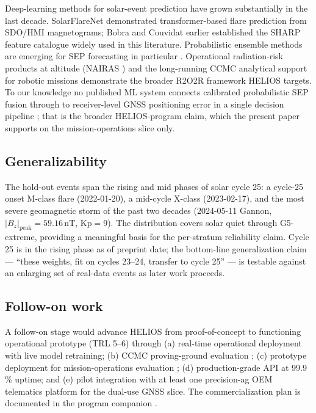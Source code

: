 \documentclass[11pt,letterpaper]{article}
\begin{document}
Deep-learning methods for solar-event prediction have grown substantially in
the last decade.  SolarFlareNet \cite{sun2023} demonstrated transformer-based
flare prediction from SDO/HMI magnetograms; Bobra and Couvidat
\cite{bobra2015} earlier established the SHARP feature catalogue widely used
in this literature.  Probabilistic ensemble methods are emerging for SEP
forecasting in particular \cite{poduval2023}.  Operational radiation-risk
products at altitude (NAIRAS \cite{mertens2025}) and the long-running
CCMC analytical support for robotic missions \cite{colladovega2023}
demonstrate the broader R2O2R framework HELIOS targets.  To our knowledge
no published ML system connects calibrated probabilistic SEP fusion through
to receiver-level GNSS positioning error in a single decision pipeline
\cite{ntrs_brazil2025,seesaw2022}; that is the broader HELIOS-program
claim, which the present paper supports on the mission-operations slice
only.

\subsection{Generalizability}

The hold-out events span the rising and mid phases of solar cycle 25:
a cycle-25 onset M-class flare (2022-01-20), a mid-cycle X-class
(2023-02-17), and the most severe geomagnetic storm of the past two
decades (2024-05-11 Gannon, $|B_z|_\mathrm{peak} = 59.16$\,nT,
Kp$=$9).  The distribution covers solar quiet
through G5-extreme, providing a meaningful basis for the per-stratum
reliability claim.  Cycle 25 is in the rising phase as of preprint date;
the bottom-line generalization claim --- ``these weights, fit on cycles
23--24, transfer to cycle 25'' --- is testable against an enlarging set
of real-data events as later work proceeds.

\subsection{Follow-on work}

A follow-on stage would advance HELIOS from proof-of-concept to functioning
operational prototype (TRL 5--6) through (a) real-time operational
deployment with live model retraining; (b) CCMC proving-ground evaluation
\cite{whitman2023,whitman2024}; (c) prototype deployment for mission-operations evaluation
\cite{m2mswao};
(d) production-grade API at 99.9\,\% uptime; and (e) pilot integration
with at least one precision-ag OEM telematics platform for the dual-use
GNSS slice.  The commercialization plan is documented in
the program companion \cite{helios_program}.
\end{document}
